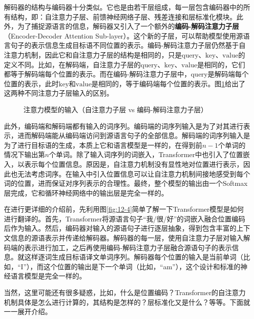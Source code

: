 \parinterval 解码器的结构与编码器十分类似。它也是由若干层组成，每一层包含编码器中的所有结构，即：自注意力子层、前馈神经网络子层、残差连接和层标准化模块。此外，为了捕捉源语言的信息，解码器又引入了一个额外的{\small\sffamily\bfseries{编码-解码注意力子层}}（Encoder-Decoder Attention Sub-layer）。这个新的子层，可以帮助模型使用源语言句子的表示信息生成目标语不同位置的表示。编码-解码注意力子层仍然基于自注意力机制，因此它和自注意力子层的结构是相同的，只是$\mathrm{query}$、$\mathrm{key}$、$\mathrm{value}$的定义不同。比如，在解码端，自注意力子层的$\mathrm{query}$、$\mathrm{key}$、$\mathrm{value}$是相同的，它们都等于解码端每个位置的表示。而在编码-解码注意力子层中，$\mathrm{query}$是解码端每个位置的表示，此时$\mathrm{key}$和$\mathrm{value}$是相同的，等于编码端每个位置的表示。图\ref{fig:12-5}给出了这两种不同注意力子层输入的区别。

\begin{figure}[htp]
    \centering
   
    \caption{ 注意力模型的输入（自注意力子层 vs 编码-解码注意力子层）}
    \label{fig:12-5}
\end{figure}

\parinterval 此外，编码端和解码端都有输入的词序列。编码端的词序列输入是为了对其进行表示，进而解码端能从编码端访问到源语言句子的全部信息。解码端的词序列输入是为了进行目标语的生成，本质上它和语言模型是一样的，在得到前$n-1$个单词的情况下输出第$n$个单词。除了输入词序列的词嵌入，Transformer中也引入了位置嵌入，以表示每个位置信息。原因是，自注意力机制没有显性地对位置进行表示，因此也无法考虑词序。在输入中引入位置信息可以让自注意力机制间接地感受到每个词的位置，进而保证对序列表示的合理性。最终，整个模型的输出由一个Softmax层完成，它和循环神经网络中的输出层是完全一样的。

\parinterval 在进行更详细的介绍前，先利用图\ref{fig:12-4}简单了解一下Transformer模型是如何进行翻译的。首先，Transformer将源语言句子“我/很/好”的词嵌入融合位置编码后作为输入。然后，编码器对输入的源语句子进行逐层抽象，得到包含丰富的上下文信息的源语表示并传递给解码器。解码器的每一层，使用自注意力子层对输入解码端的表示进行加工，之后再使用编码-解码注意力子层融合源语句子的表示信息。就这样逐词生成目标语译文单词序列。解码器每个位置的输入是当前单词（比如，“I”），而这个位置的输出是下一个单词（比如，“am”），这个设计和标准的神经语言模型是完全一样的。

\parinterval 当然，这里可能还有很多疑惑，比如，什么是位置编码？Transformer的自注意力机制具体是怎么进行计算的，其结构是怎样的？层标准化又是什么？等等。下面就一一展开介绍。

